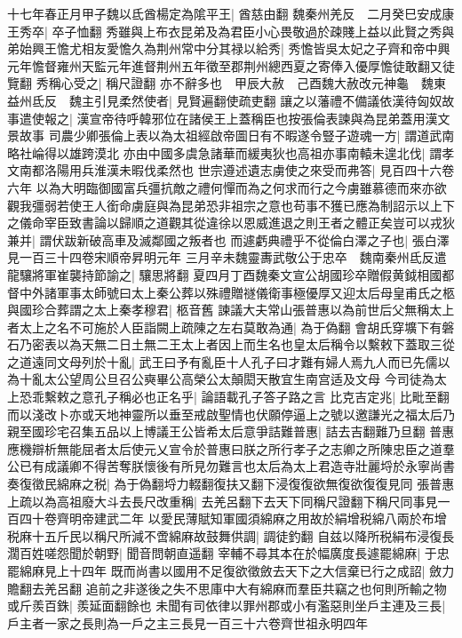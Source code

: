 十七年春正月甲子魏以氐酋楊定為隂平王|{
	酋慈由翻}
魏秦州羌反　二月癸巳安成康王秀卒|{
	卒子恤翻}
秀雖與上布衣昆弟及為君臣小心畏敬過於疎賤上益以此賢之秀與弟始興王憺尤相友愛憺久為荆州常中分其禄以給秀|{
	秀憺皆吳太妃之子齊和帝中興元年憺督雍州天監元年進督荆州五年徵至郡荆州總西夏之寄俸入優厚憺徒敢翻又徒覽翻}
秀稱心受之|{
	稱尺證翻}
亦不辭多也　甲辰大赦　己酉魏大赦改元神龜　魏東益州氐反　魏主引見柔然使者|{
	見賢遍翻使疏吏翻}
讓之以藩禮不備議依漢待匈奴故事遣使報之|{
	漢宣帝待呼韓邪位在諸侯王上蓋稱臣也按張倫表諫與為昆弟蓋用漢文景故事}
司農少卿張倫上表以為太祖經啟帝圖日有不暇遂令豎子遊魂一方|{
	謂道武南略社崘得以雄跨漠北}
亦由中國多虞急諸華而緩夷狄也高祖亦事南轅未遑北伐|{
	謂孝文南都洛陽用兵淮漢未暇伐柔然也}
世宗遵述遺志虜使之來受而弗答|{
	見百四十六卷六年}
以為大明臨御國富兵彊抗敵之禮何憚而為之何求而行之今虜雖慕德而來亦欲觀我彊弱若使王人銜命虜庭與為昆弟恐非祖宗之意也苟事不獲已應為制詔示以上下之儀命宰臣致書論以歸順之道觀其從違徐以恩威進退之則王者之體正矣豈可以戎狄兼并|{
	謂伏跋新破高車及滅鄰國之叛者也}
而遽虧典禮乎不從倫白澤之子也|{
	張白澤見一百三十四卷宋順帝昇明元年}
三月辛未魏靈夀武敬公于忠卒　魏南秦州氐反遣龍驤將軍崔襲持節諭之|{
	驤思將翻}
夏四月丁酉魏秦文宣公胡國珍卒贈假黄鉞相國都督中外諸軍事太師號曰太上秦公葬以殊禮贈禭儀衛事極優厚又迎太后母皇甫氏之柩與國珍合葬謂之太上秦孝穆君|{
	柩音舊}
諫議大夫常山張普惠以為前世后父無稱太上者太上之名不可施於人臣詣闕上疏陳之左右莫敢為通|{
	為于偽翻}
會胡氏穿壙下有磐石乃密表以為天無二日土無二王太上者因上而生名也皇太后稱令以繫敕下蓋取三從之道遠同文母列於十亂|{
	武王曰予有亂臣十人孔子曰才難有婦人焉九人而已先儒以為十亂太公望周公旦召公奭畢公高榮公太顛閎天散宜生南宫适及文母}
今司徒為太上恐乖繫敕之意孔子稱必也正名乎|{
	論語載孔子答子路之言}
比克吉定兆|{
	比毗至翻}
而以淺改卜亦或天地神靈所以垂至戒啟聖情也伏願停逼上之號以邀謙光之福太后乃親至國珍宅召集五品以上博議王公皆希太后意爭詰難普惠|{
	詰去吉翻難乃旦翻}
普惠應機辯析無能屈者太后使元乂宣令於普惠曰朕之所行孝子之志卿之所陳忠臣之道羣公已有成議卿不得苦奪朕懷後有所見勿難言也太后為太上君造寺壯麗埒於永寧尚書奏復徵民綿麻之税|{
	為于偽翻埒力輟翻復扶又翻下浸復復欲無復欲復復見同}
張普惠上疏以為高祖廢大斗去長尺改重稱|{
	去羌呂翻下去天下同稱尺證翻下稱尺同事見一百四十卷齊明帝建武二年}
以愛民薄賦知軍國須綿麻之用故於絹增税綿八兩於布增税麻十五斤民以稱尺所減不啻綿麻故鼓舞供調|{
	調徒釣翻}
自兹以降所税絹布浸復長濶百姓嗟怨聞於朝野|{
	聞音問朝直遥翻}
宰輔不尋其本在於幅廣度長遽罷綿麻|{
	于忠罷綿麻見上十四年}
既而尚書以國用不足復欲徵斂去天下之大信棄已行之成詔|{
	斂力贍翻去羌呂翻}
追前之非遂後之失不思庫中大有綿麻而羣臣共竊之也何則所輸之物或斤羨百銖|{
	羨延面翻餘也}
未聞有司依律以罪州郡或小有濫惡則坐戶主連及三長|{
	戶主者一家之長則為一戶之主三長見一百三十六卷齊世祖永明四年}
